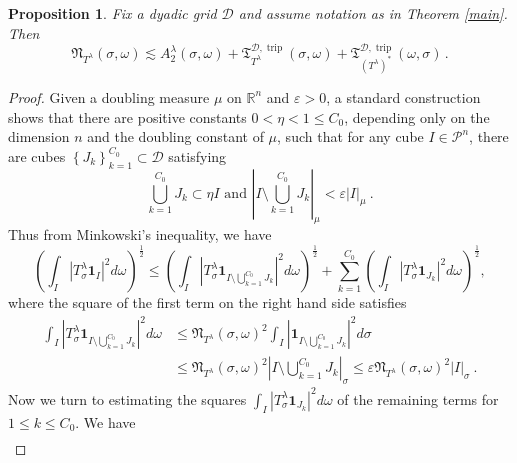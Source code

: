 \documentclass{amsart}%
\theoremstyle{plain}
\newtheorem{proposition}[theorem]{Proposition}
\numberwithin{equation}{section}
\begin{document}
\begin{proposition}
\label{single}Fix a dyadic grid $\mathcal{D}$ and assume notation as in Theorem \ref{main}. Then%
\[
\mathfrak{N}_{T^{\lambda}}\left(  \sigma,\omega\right)  \lesssim   A_{2}^{\lambda}\left(  \sigma,\omega\right)  +\mathfrak{T}%
_{T^{\lambda}}^{\mathcal{D},\operatorname*{trip}}\left(  \sigma,\omega\right)
+\mathfrak{T}_{\left(  T^{\lambda}\right)  ^{\ast}}^{\mathcal{D}%
,\operatorname*{trip}}\left(  \omega,\sigma\right)  \,   .
\]

\end{proposition}

\begin{proof}
Given a doubling measure $\mu$ on $\mathbb{R}^{n}$ and $\varepsilon>0$, a
standard construction shows that there are positive constants $0<\eta<1\leq
C_{0}$, depending only on the dimension $n$ and the doubling constant of $\mu
$, such that for any cube $I\in\mathcal{P}^{n}$, there are cubes $\left\{
J_{k}\right\}  _{k=1}^{C_{0}}\subset\mathcal{D}$ satisfying
\[
\bigcup_{k=1}^{C_{0}}J_{k}\subset\eta I\text{ and }\left\vert I\setminus
\bigcup_{k=1}^{C_{0}}J_{k}\right\vert _{\mu}<\varepsilon\left\vert
I\right\vert _{\mu}\ .
\]
Thus from Minkowski's inequality, we have%
\[
\left(  \int_{I}\left\vert T_{\sigma}^{\lambda}\mathbf{1}_{I}\right\vert
^{2}d\omega\right)  ^{\frac{1}{2}}\leq\left(  \int_{I}\left\vert T_{\sigma
}^{\lambda}\mathbf{1}_{I\setminus\bigcup_{k=1}^{C_{0}}J_{k}}\right\vert
^{2}d\omega\right)  ^{\frac{1}{2}}+\sum_{k=1}^{C_{0}}\left(  \int
_{I}\left\vert T_{\sigma}^{\lambda}\mathbf{1}_{J_{k}}\right\vert ^{2}%
d\omega\right)  ^{\frac{1}{2}},
\]
where the square of the first term on the right hand side satisfies%
\begin{align*}
\int_{I}\left\vert T_{\sigma}^{\lambda}\mathbf{1}_{I\setminus\bigcup
_{k=1}^{C_{0}}J_{k}}\right\vert ^{2}d\omega &  \leq\mathfrak{N}_{T^{\lambda}%
}\left(  \sigma,\omega\right)  ^{2}\int_{I}\left\vert \mathbf{1}%
_{I\setminus\bigcup_{k=1}^{C_{0}}J_{k}}\right\vert ^{2}d\sigma\\
&  \leq\mathfrak{N}_{T^{\lambda}}\left(  \sigma,\omega\right)  ^{2}\left\vert
I\setminus\bigcup_{k=1}^{C_{0}}J_{k}\right\vert _{\sigma}\leq\varepsilon
\mathfrak{N}_{T^{\lambda}}\left(  \sigma,\omega\right)  ^{2}\left\vert
I\right\vert _{\sigma}\ .
\end{align*}
Now we turn to estimating the squares $\int_{I}\left\vert T_{\sigma}^{\lambda
}\mathbf{1}_{J_{k}}\right\vert ^{2}d\omega$ of the remaining terms for $1\leq
k\leq C_{0}$. We have%
\begin{align*}

\end{align*}
\end{proof}
\end{document}
